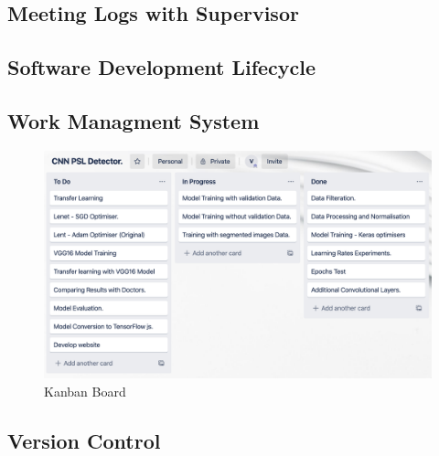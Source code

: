 \subsection*{Meeting Logs with Supervisor}
\subsection*{Software Development Lifecycle}
\subsection*{Work Managment System}
\begin{figure}[!htp]
    \centering
    \includegraphics[width=15cm]{Images/Kanban Bords.png}
    \caption{Kanban Board}
\end{figure}
\subsection*{Version Control}



